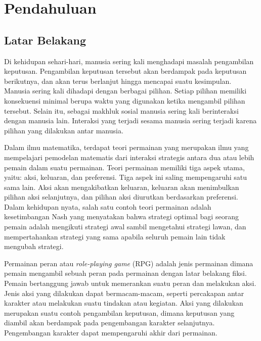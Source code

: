 \chapter{Pendahuluan}

\section{Latar Belakang}
\label{sec:latarbelakang}

Di kehidupan sehari-hari, manusia sering kali menghadapi masalah pengambilan keputusan. Pengambilan keputusan tersebut akan berdampak pada keputusan berikutnya, dan akan terus berlanjut hingga mencapai suatu kesimpulan. Manusia sering kali dihadapi dengan berbagai pilihan. Setiap pilihan memiliki konsekuensi minimal berupa waktu yang digunakan ketika mengambil pilihan tersebut. Selain itu, sebagai makhluk sosial manusia sering kali berinteraksi dengan manusia lain. Interaksi yang terjadi sesama manusia sering terjadi karena pilihan yang dilakukan antar manusia.


Dalam ilmu matematika, terdapat teori permainan yang merupakan ilmu yang mempelajari pemodelan matematis dari interaksi strategis antara dua atau lebih pemain dalam suatu permainan. Teori permainan memiliki tiga aspek utama, yaitu: aksi, keluaran, dan preferensi. Tiga aspek ini saling mempengaruhi satu sama lain. Aksi akan mengakibatkan keluaran, keluaran akan menimbulkan pilihan aksi selanjutnya, dan pilihan aksi diurutkan berdasarkan preferensi. Dalam kehidupan nyata, salah satu contoh teori permainan adalah kesetimbangan Nash yang menyatakan bahwa strategi optimal bagi seorang pemain adalah mengikuti strategi awal sambil mengetahui strategi lawan, dan mempertahankan strategi yang sama apabila seluruh pemain lain tidak mengubah strategi.

Permainan peran atau \textit{role-playing game} (RPG) adalah jenis permainan dimana pemain mengambil sebuah peran pada permainan dengan latar belakang fiksi. Pemain bertanggung jawab untuk memerankan suatu peran dan melakukan aksi. Jenis aksi yang dilakukan dapat bermacam-macam, seperti percakapan antar karakter atau melakukan suatu tindakan atau kegiatan. Aksi yang dilakukan merupakan suatu contoh pengambilan keputusan, dimana keputusan yang diambil akan berdampak pada pengembangan karakter selanjutnya. Pengembangan karakter dapat mempengaruhi akhir dari permainan.


